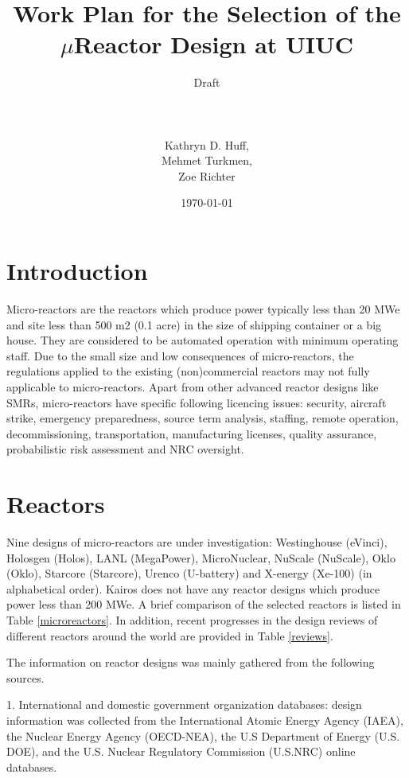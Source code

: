 \documentclass[10pt,a4paper]{article}
\begin{document}
\title{Work Plan for the Selection of the $\mu$Reactor Design at UIUC\\}
\author{Draft\\ \\ \\ \\ Kathryn D. Huff,\\
Mehmet Turkmen,\\
Zoe Richter}
\date{\today}
\maketitle

\pagebreak
\section{Introduction}
Micro-reactors are the reactors which produce power typically less than 20 MWe and site less than 500 m2 (0.1 acre) in the size of shipping container or a big house. They are considered to be automated operation with minimum operating staff. Due to the small size and low consequences of micro-reactors, the regulations applied to the existing (non)commercial reactors may not fully applicable to micro-reactors. Apart from other advanced reactor designs like SMRs, micro-reactors have specific following licencing issues: security, aircraft strike, emergency preparedness, source term analysis, staffing, remote operation, decommissioning, transportation, manufacturing licenses, quality assurance, probabilistic risk assessment and NRC oversight.

\section{Reactors}
Nine designs of micro-reactors are under investigation: Westinghouse (eVinci), Holosgen (Holos), LANL (MegaPower), MicroNuclear, NuScale (NuScale), Oklo (Oklo), Starcore (Starcore), Urenco (U-battery) and X-energy (Xe-100) (in alphabetical order). Kairos does not have any reactor designs which produce power less than 200 MWe. A brief comparison of the selected reactors is listed in Table \ref{microreactors}. In addition, recent progresses in the design reviews of different reactors around the world are provided in Table \ref{reviews}. 

The information on reactor designs was mainly gathered from the following sources.

1. International and domestic government organization databases: design information was collected from the International Atomic Energy Agency (IAEA), the Nuclear Energy Agency (OECD-NEA), the U.S Department of Energy (U.S. DOE), and the U.S.
Nuclear Regulatory Commission (U.S.NRC) online databases.
\end{document}
